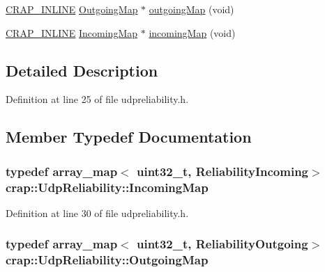 \begin{DoxyCompactItemize}
\item 
\hyperlink{config__x86_8h_a5a40526b8d842e7ff731509998bb0f1c}{C\+R\+A\+P\+\_\+\+I\+N\+L\+I\+N\+E} \hyperlink{classcrap_1_1_udp_reliability_a8dde825107f0bdc30042114a16cb9dfe}{Outgoing\+Map} $\ast$ \hyperlink{classcrap_1_1_udp_reliability_a26a0d173c1d592b1f088c38f91b39ff2}{outgoing\+Map} (void)
\item 
\hyperlink{config__x86_8h_a5a40526b8d842e7ff731509998bb0f1c}{C\+R\+A\+P\+\_\+\+I\+N\+L\+I\+N\+E} \hyperlink{classcrap_1_1_udp_reliability_aa39e31ccb6b2a80c031f959467e0c126}{Incoming\+Map} $\ast$ \hyperlink{classcrap_1_1_udp_reliability_a9f81728be31eca9cb5e60e6f0648d95d}{incoming\+Map} (void)
\end{DoxyCompactItemize}


\subsection{Detailed Description}


Definition at line 25 of file udpreliability.\+h.



\subsection{Member Typedef Documentation}
\hypertarget{classcrap_1_1_udp_reliability_aa39e31ccb6b2a80c031f959467e0c126}{}
\subsubsection[{Incoming\+Map}]{\setlength{\rightskip}{0pt plus 5cm}typedef {\bf array\+\_\+map}$<$ uint32\+\_\+t, {\bf Reliability\+Incoming}$>$ {\bf crap\+::\+Udp\+Reliability\+::\+Incoming\+Map}}\label{classcrap_1_1_udp_reliability_aa39e31ccb6b2a80c031f959467e0c126}


Definition at line 30 of file udpreliability.\+h.

\hypertarget{classcrap_1_1_udp_reliability_a8dde825107f0bdc30042114a16cb9dfe}{}
\subsubsection[{Outgoing\+Map}]{\setlength{\rightskip}{0pt plus 5cm}typedef {\bf array\+\_\+map}$<$ uint32\+\_\+t, {\bf Reliability\+Outgoing}$>$ {\bf crap\+::\+Udp\+Reliability\+::\+Outgoing\+Map}}\label{classcrap_1_1_udp_reliability_a8dde825107f0bdc30042114a16cb9dfe}


